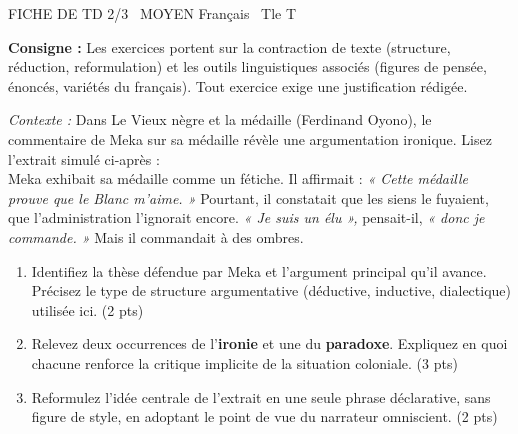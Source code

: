 \documentclass[11pt]{article}
\begin{document}
\begin{tcolorbox}[enhanced,colback=popink,colframe=popink,arc=10pt,boxrule=0pt,left=12pt,right=12pt,top=9pt,bottom=9pt]
{\color{white}\popxbold\small FICHE DE TD 2/3 \textbullet\ MOYEN \hfill Français \textbullet\ Tle T\par}
\end{tcolorbox}
\vspace{4pt}
\noindent\textbf{Consigne :} Les exercices portent sur la contraction de texte (structure, réduction, reformulation) et les outils linguistiques associés (figures de pensée, énoncés, variétés du français). Tout exercice exige une justification rédigée.

\begin{exercice}
\textit{Contexte :} Dans \og Le Vieux nègre et la médaille \fg{} (Ferdinand Oyono), le commentaire de Meka sur sa médaille révèle une argumentation ironique. Lisez l'extrait simulé ci-après : \\
\og Meka exhibait sa médaille comme un fétiche. Il affirmait : \textit{« Cette médaille prouve que le Blanc m'aime. »} Pourtant, il constatait que les siens le fuyaient, que l'administration l'ignorait encore. \textit{« Je suis un élu »,} pensait-il, \textit{« donc je commande. »} Mais il commandait à des ombres. \fg{}

\begin{enumerate}
    \item Identifiez la thèse défendue par Meka et l'argument principal qu'il avance. Précisez le type de structure argumentative (déductive, inductive, dialectique) utilisée ici. (2 pts)
    \item Relevez deux occurrences de l'\textbf{ironie} et une du \textbf{paradoxe}. Expliquez en quoi chacune renforce la critique implicite de la situation coloniale. (3 pts)
    \item Reformulez l'idée centrale de l'extrait en une seule phrase déclarative, sans figure de style, en adoptant le point de vue du narrateur omniscient. (2 pts)
\end{enumerate}
\end{exercice}
\end{document}

